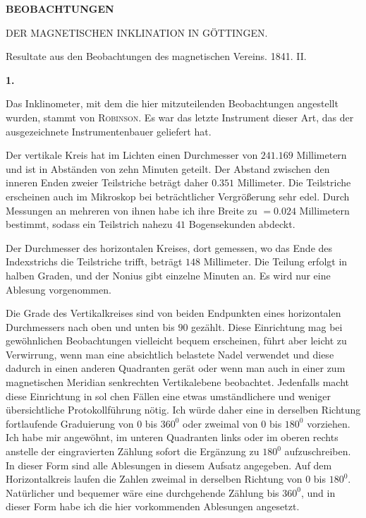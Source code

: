 \clearpage
{}
\begin{center}
{\Large\bfseries BEOBACHTUNGEN\par\medskip DER MAGNETISCHEN INKLINATION IN GÖTTINGEN.}
\par\bigskip
Resultate aus den Beobachtungen des magnetischen Vereins. 1841. II.
\end{center}
\begingroup
\renewcommand{\Article}[1]{\par\medskip\Needspace{4\baselineskip}\pdfbookmark[1]{#1.}{inclination-observations-art-#1}\centerline{\textbf{#1.}}\nobreak\smallskip}%
\Article{1}
Das Inklinometer, mit dem die hier mitzuteilenden Beobachtungen angestellt wurden, stammt von \textsc{Robinson}. Es war das letzte Instrument dieser Art, das der ausgezeichnete Instrumentenbauer geliefert hat.

Der vertikale Kreis hat im Lichten einen Durchmesser von $241.169$ Millimetern und ist in Abständen von zehn Minuten geteilt. Der Abstand zwischen den inneren Enden zweier Teilstriche beträgt daher $0.351$ Millimeter. Die Teilstriche erscheinen auch im Mikroskop bei beträchtlicher Vergrößerung sehr edel. Durch Messungen an mehreren von ihnen habe ich ihre Breite zu $=0.024$ Millimetern bestimmt, sodass ein Teilstrich nahezu $41$ Bogensekunden abdeckt.

Der Durchmesser des horizontalen Kreises, dort gemessen, wo das Ende des Indexstrichs die Teilstriche trifft, beträgt $148$ Millimeter. Die Teilung erfolgt in halben Graden, und der Nonius gibt einzelne Minuten an. Es wird nur eine Ablesung vorgenommen.

Die Grade des Vertikalkreises sind von beiden Endpunkten eines horizontalen Durchmessers nach oben und unten bis $90$ gezählt. Diese Einrichtung mag bei gewöhnlichen Beobachtungen vielleicht bequem erscheinen, führt aber leicht zu Verwirrung, wenn man eine absichtlich belastete Nadel verwendet und diese dadurch in einen anderen Quadranten gerät oder wenn man auch in einer zum magnetischen Meridian senkrechten Vertikalebene beobachtet. Jedenfalls macht diese Einrichtung in sol%
%
chen Fällen eine etwas umständlichere und weniger übersichtliche Protokollführung nötig. Ich würde daher eine in derselben Richtung fortlaufende Graduierung von $0$ bis $360^0$ oder zweimal von $0$ bis $180^0$ vorziehen. Ich habe mir angewöhnt, im unteren Quadranten links oder im oberen rechts anstelle der eingravierten Zählung sofort die Ergänzung zu $180^0$ aufzuschreiben. In dieser Form sind alle Ablesungen in diesem Aufsatz angegeben. Auf dem Horizontalkreis laufen die Zahlen zweimal in derselben Richtung von $0$ bis $180^0$. Natürlicher und bequemer wäre eine durchgehende Zählung bis $360^0$, und in dieser Form habe ich die hier vorkommenden Ablesungen angesetzt.

